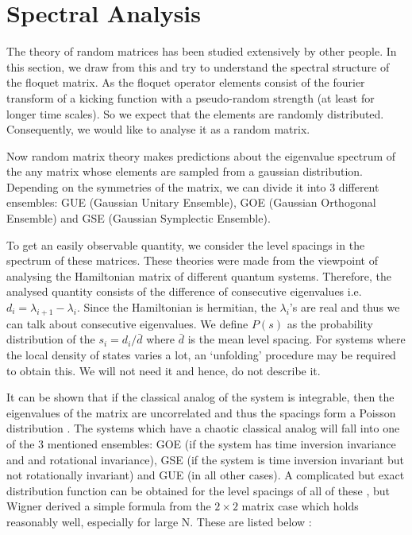 \documentclass[twocolumn,nobalancelastpage]{report}
\begin{document}
\section{Spectral Analysis}
The theory of random matrices has been studied extensively by other people.
In this section, we draw from this and try to understand the spectral
structure of the floquet matrix. As the floquet operator elements consist
of the fourier transform of a kicking function with a pseudo-random strength
(at least for longer time scales). So we expect that the elements are randomly
distributed. Consequently, we would like to analyse it as a random matrix.

Now random matrix theory makes predictions about the eigenvalue spectrum
of the any matrix whose elements are sampled from a gaussian distribution.
Depending on the symmetries of the matrix, we can divide it into 3 different
ensembles: GUE (Gaussian Unitary Ensemble), GOE (Gaussian Orthogonal Ensemble)
and GSE (Gaussian Symplectic Ensemble).

To get an easily observable quantity, we consider the level spacings in the
spectrum of these matrices. These theories were made from the viewpoint of
analysing the Hamiltonian matrix of different quantum systems. Therefore,
the analysed quantity consists of the difference of consecutive eigenvalues
i.e. $d_i = \lambda_{i+1} - \lambda_{i}$. Since the Hamiltonian is hermitian, the
$\lambda_i$'s are real and thus we can talk about consecutive eigenvalues.
We define $P(s)$ as the probability distribution of the $s_i = d_i / \bar{d}$
where $\bar{d}$ is the mean level spacing. For systems where the local
density of states varies a lot, an `unfolding' procedure may be required to
obtain this. We will not need it and hence, do not describe it.

It can be shown that if the classical analog of the system is integrable,
then the eigenvalues of the matrix are uncorrelated and thus the spacings
form a Poisson distribution \cite{stockmann}\cite{mehta_random_2004}. The
systems which have a chaotic classical analog will fall into one of the 3
mentioned ensembles: GOE (if the system has time inversion invariance and
and rotational invariance), GSE (if the system is time inversion invariant
but not rotationally invariant) and GUE (in all other cases). A complicated
but exact distribution function can be obtained for the level spacings of
all of these \cite{mehta_random_2004}, but Wigner derived a simple formula
from the $2 \times 2$ matrix case which holds reasonably well, especially
for large N. These are listed below \cite{stockmann}:
\end{document}
